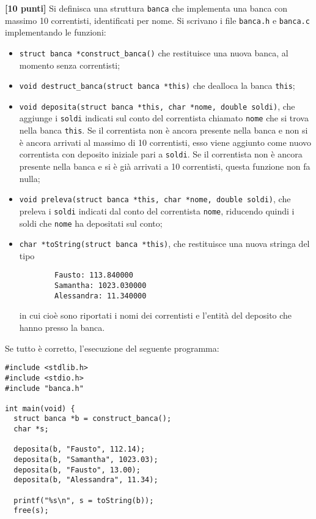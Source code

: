 \documentclass{article}[10pt]
\newcounter{esnu}
\newenvironment{esercizio}{\medskip \noindent {\bf Esercizio\addtocounter{esnu}{1} \arabic{esnu}}}{}
\begin{document}
\begin{esercizio}
\textbf{[10 punti]}
%
Si definisca una struttura \texttt{banca} che implementa una banca con massimo 10 correntisti,
identificati per nome.
Si scrivano i file \texttt{banca.h} e \texttt{banca.c} implementando le funzioni:
%
\begin{itemize}
\item \texttt{struct banca *construct\_banca()} che restituisce una nuova banca,
      al momento senza correntisti;
\item \texttt{void destruct\_banca(struct banca *this)} che dealloca la banca \texttt{this};
\item \texttt{void deposita(struct banca *this, char *nome, double soldi)},
      che aggiunge i \texttt{soldi} indicati sul conto del correntista chiamato \texttt{nome} che si
      trova nella banca \texttt{this}. Se il correntista non \`e ancora presente
      nella banca e non si
      \`e ancora arrivati al massimo di 10 correntisti, esso viene aggiunto come nuovo correntista con deposito
      iniziale pari a \texttt{soldi}.  Se il correntista non \`e ancora presente
      nella banca e si \`e gi\`a arrivati a 10 correntisti, questa funzione non
      fa nulla;
\item \texttt{void preleva(struct banca *this, char *nome, double soldi)}, che preleva i \texttt{soldi} indicati
      dal conto del correntista \texttt{nome}, riducendo quindi i soldi che \texttt{nome} ha depositati sul conto;
\item \texttt{char *toString(struct banca *this)}, che restituisce una nuova stringa del
      tipo
      \begin{verbatim}
        Fausto: 113.840000
        Samantha: 1023.030000
        Alessandra: 11.340000
      \end{verbatim}
      in cui cio\`e sono riportati i nomi dei correntisti e l'entit\`a del deposito che hanno presso
      la banca.
\end{itemize}
%
Se tutto \`e corretto, l'esecuzione del seguente programma:

{\small
\begin{verbatim}
#include <stdlib.h>
#include <stdio.h>
#include "banca.h"

int main(void) {
  struct banca *b = construct_banca();
  char *s;

  deposita(b, "Fausto", 112.14);
  deposita(b, "Samantha", 1023.03);
  deposita(b, "Fausto", 13.00);
  deposita(b, "Alessandra", 11.34);

  printf("%s\n", s = toString(b));
  free(s);


\end{verbatim}}
\end{esercizio}
\end{document}
